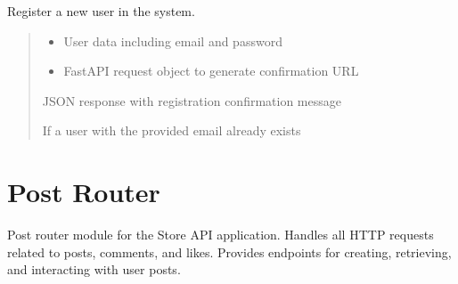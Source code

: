 \documentclass[letterpaper,10pt,openany,oneside,english]{sphinxmanual}
\begin{document}

\begin{savenotes}\begin{fulllineitems}
\label{\detokenize{modules/routers:storeapi.routers.user.register}}
\pysigstartsignatures
{}
\pysigstopsignatures
\sphinxAtStartPar
Register a new user in the system.
\begin{quote}\begin{description}
\begin{itemize}
\item {} 
\sphinxAtStartPar
{} \textendash{} User data including email and password

\item {} 
\sphinxAtStartPar
{} \textendash{} FastAPI request object to generate confirmation URL

\end{itemize}

\sphinxAtStartPar
JSON response with registration confirmation message

\sphinxAtStartPar
{} \textendash{} If a user with the provided email already exists

\end{description}\end{quote}

\end{fulllineitems}\end{savenotes}



\section{Post Router}
\label{\detokenize{modules/routers:module-storeapi.routers.post}}\label{\detokenize{modules/routers:post-router}}
\sphinxAtStartPar
Post router module for the Store API application.
Handles all HTTP requests related to posts, comments, and likes.
Provides endpoints for creating, retrieving, and interacting with user posts.
\end{document}
